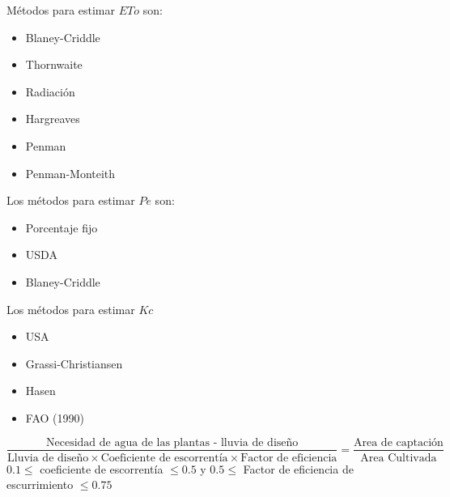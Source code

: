 Métodos para estimar $ETo$ son:
\begin{itemize}
    \item Blaney-Criddle
    \item Thornwaite
    \item Radiación
    \item Hargreaves
    \item Penman
    \item Penman-Monteith
\end{itemize}
Los métodos para estimar $Pe$ son:
\begin{itemize}
    \item Porcentaje fijo
    \item USDA
    \item Blaney-Criddle
\end{itemize}
Los métodos para estimar $Kc$
\begin{itemize}
    \item USA
    \item Grassi-Christiansen
    \item Hasen
    \item FAO (1990)
\end{itemize}
\begin{equation}
    \frac{\text{Necesidad de agua de las plantas - lluvia de diseño}}{\text{Lluvia de diseño}\times\text{Coeficiente de escorrentía}\times\text{Factor de eficiencia}}=\frac{\text{Area de captación}}{\text{Area Cultivada}}
\end{equation}
$0.1\leq$ coeficiente de escorrentía $\leq 0.5$ y $0.5\leq$ Factor de eficiencia de escurrimiento $\leq 0.75$

